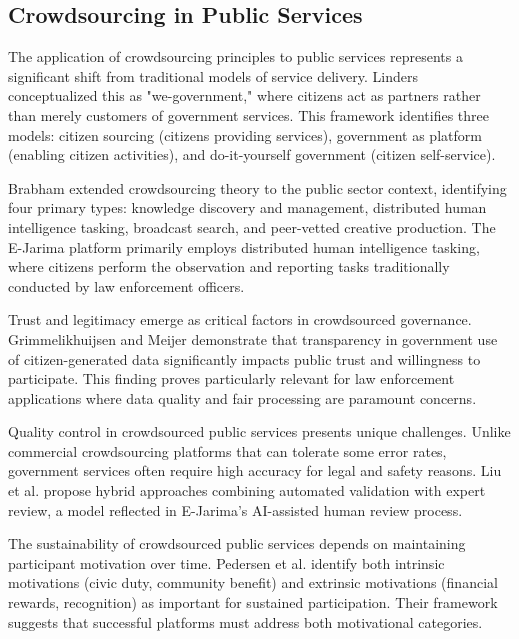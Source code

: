 \documentclass[pdflatex,sn-mathphys-num]{sn-jnl}%
\theoremstyle{thmstyleone}%
\theoremstyle{thmstyletwo}%
\theoremstyle{thmstylethree}%
\begin{document}
\subsection{Crowdsourcing in Public Services}\label{subsec5}

The application of crowdsourcing principles to public services represents a significant shift from traditional models of service delivery. Linders \cite{linders2012we} conceptualized this as "we-government," where citizens act as partners rather than merely customers of government services. This framework identifies three models: citizen sourcing (citizens providing services), government as platform (enabling citizen activities), and do-it-yourself government (citizen self-service).

Brabham \cite{brabham2013crowdsourcing} extended crowdsourcing theory to the public sector context, identifying four primary types: knowledge discovery and management, distributed human intelligence tasking, broadcast search, and peer-vetted creative production. The E-Jarima platform primarily employs distributed human intelligence tasking, where citizens perform the observation and reporting tasks traditionally conducted by law enforcement officers.

Trust and legitimacy emerge as critical factors in crowdsourced governance. Grimmelikhuijsen and Meijer \cite{grimmelikhuijsen2018legitimacy} demonstrate that transparency in government use of citizen-generated data significantly impacts public trust and willingness to participate. This finding proves particularly relevant for law enforcement applications where data quality and fair processing are paramount concerns.

Quality control in crowdsourced public services presents unique challenges. Unlike commercial crowdsourcing platforms that can tolerate some error rates, government services often require high accuracy for legal and safety reasons. Liu et al. \cite{liu2014crowdsourcing} propose hybrid approaches combining automated validation with expert review, a model reflected in E-Jarima's AI-assisted human review process.

The sustainability of crowdsourced public services depends on maintaining participant motivation over time. Pedersen et al. \cite{pedersen2013crowdsourcing} identify both intrinsic motivations (civic duty, community benefit) and extrinsic motivations (financial rewards, recognition) as important for sustained participation. Their framework suggests that successful platforms must address both motivational categories.
\end{document}
